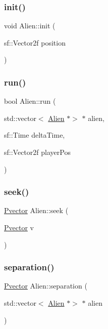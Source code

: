 \mbox{\label{class_alien_a516b6245841735741f287b38c20b8853}} 
\subsubsection{\texorpdfstring{init()}{init()}}
{\footnotesize\ttfamily void Alien\+::init (\begin{DoxyParamCaption}\item[{sf\+::\+Vector2f}]{position }\end{DoxyParamCaption})}

\mbox{\label{class_alien_a7ae22c9eb89a6b1896bc7c237880b9ba}} 
\subsubsection{\texorpdfstring{run()}{run()}}
{\footnotesize\ttfamily bool Alien\+::run (\begin{DoxyParamCaption}\item[{std\+::vector$<$ \hyperlink{class_alien}{Alien} $\ast$$>$ $\ast$}]{alien,  }\item[{sf\+::\+Time}]{delta\+Time,  }\item[{sf\+::\+Vector2f}]{player\+Pos }\end{DoxyParamCaption})}

\mbox{\label{class_alien_aadb10553ae97d31376dba97e0b0599a8}} 
\subsubsection{\texorpdfstring{seek()}{seek()}}
{\footnotesize\ttfamily \hyperlink{class_pvector}{Pvector} Alien\+::seek (\begin{DoxyParamCaption}\item[{\hyperlink{class_pvector}{Pvector}}]{v }\end{DoxyParamCaption})}

\mbox{\label{class_alien_a9ff194fbdb318bb84153e55051c5af8e}} 
\subsubsection{\texorpdfstring{separation()}{separation()}}
{\footnotesize\ttfamily \hyperlink{class_pvector}{Pvector} Alien\+::separation (\begin{DoxyParamCaption}\item[{std\+::vector$<$ \hyperlink{class_alien}{Alien} $\ast$$>$ $\ast$}]{alien }\end{DoxyParamCaption})}


